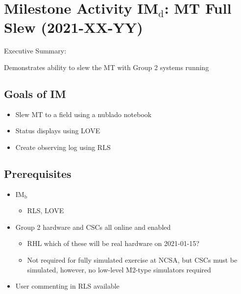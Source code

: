 \section{Milestone Activity IM\(_{\text{d}}\): MT Full Slew                        (2021-XX-YY)}
\label{sec:org8fae86b}

Executive Summary:

Demonstrates ability to slew the MT with Group 2 systems running

\subsection{Goals of IM}
\label{sec:orge56fee6}
\begin{itemize}
\item Slew MT to a field using a nublado notebook
\item Status displays using LOVE
\item Create observing log using RLS
\end{itemize}

\subsection{Prerequisites}
\begin{itemize}
\item{IM\(_{\text{b}}\)}
  \begin{itemize}
  \item RLS, LOVE
  \end{itemize}
\item{Group 2 hardware and CSCs all online and enabled}
  \begin{itemize}
  \item RHL which of these will be real hardware on 2021-01-15?
  \item Not required for fully simulated exercise at NCSA, but CSCs must be simulated,
    however, no low-level M2-type simulators required
  \end{itemize}
\item{User commenting in RLS available}
\end{itemize}

